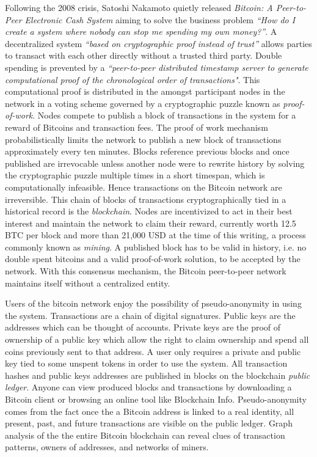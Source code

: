 \documentclass[a4paper,12pt]{article} %
\begin{document}
Following the 2008 crisis, Satoshi Nakamoto quietly released \textit{Bitcoin: A Peer-to-Peer Electronic Cash System}\cite{nakamoto2008bitcoin} aiming to solve the business problem \textit{``How do I create a system where nobody can stop me spending my own money?''}\cite{brown2016introducing}. A decentralized system \textit{``based on cryptographic proof instead of trust''} allows parties to transact with each other directly without a trusted third party. Double spending is prevented by a \textit{``peer-to-peer distributed timestamp server to generate computational proof of the chronological order of transactions"}\cite{nakamoto2008bitcoin}. This computational proof is distributed in the amongst participant nodes in the network in a voting scheme governed by a cryptographic puzzle known as \textit{proof-of-work}. Nodes compete to publish a block of transactions in the system for a reward of Bitcoins and transaction fees. The proof of work mechanism probabilistically limits the network to publish a new block of transactions approximately every ten minutes. Blocks reference previous blocks and once published are irrevocable unless another node were to rewrite history by solving the cryptographic puzzle multiple times in a short timespan, which is computationally infeasible. Hence transactions on the Bitcoin network are irreversible. This chain of blocks of transactions cryptographically tied in a historical record is the \textit{blockchain}. Nodes are incentivized to act in their best interest and maintain the network to claim their reward, currently worth 12.5 BTC per block and more than 21,000 USD at the time of this writing\cite{btcPrice}, a process commonly known as \textit{mining}. A published block has to be valid in history, i.e. no double spent bitcoins and a valid proof-of-work solution, to be accepted by the network. With this consensus mechanism, the Bitcoin peer-to-peer network maintains itself without a centralized entity\cite{nakamoto2008bitcoin}.

Users of the bitcoin network enjoy the possibility of pseudo-anonymity in using the system. Transactions are a chain of digital signatures. Public keys are the addresses which can be thought of accounts. Private keys are the proof of ownership of a public key which allow the right to claim ownership and spend all coins previously sent to that address. A user only requires a private and public key tied to some unspent tokens in order to use the system\cite{nakamoto2008bitcoin}. All transaction hashes and public keys addresses are published in blocks on the blockchain \textit{public ledger}. Anyone can view produced blocks and transactions by downloading a Bitcoin client or browsing an online tool like Blockchain Info\cite{blockchaininfo}.  Pseudo-anonymity comes from the fact once the a Bitcoin address is linked to a real identity, all present, past, and future transactions are visible on the public ledger. Graph analysis of the the entire Bitcoin blockchain can reveal clues of transaction patterns, owners of addresses, and networks of miners\cite{Ron2013}.
\end{document}
